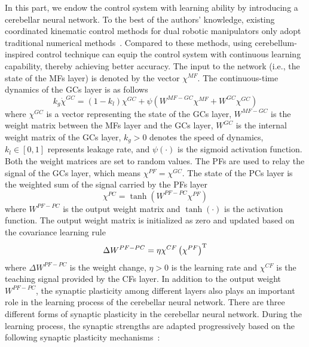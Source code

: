 \documentclass[journal,twoside,web]{ieeecolor}
\begin{document}
In this part, we endow the control system with learning ability by introducing a cerebellar neural network. To the best of the authors' knowledge, existing coordinated kinematic control methods for dual robotic manipulators only adopt traditional numerical methods~\cite{Chen2020,Zhang2021TNNLS}. Compared to these methods, using cerebellum-inspired control technique can equip the control system with continuous learning capability, thereby achieving better accuracy. The input to the network (i.e., the state of the MFs layer) is denoted by the vector $\chi^{MF}$. The continuous-time dynamics of the GCs layer is as follows
\begin{equation}
k_g\dot{\chi}^{GC} = (1-k_l) \chi^{GC} + \psi\left(W^{MF-GC}\chi^{MF} + W^{GC} \chi^{GC}\right)
\label{eq:GC}
\end{equation}
where $\chi^{GC}$ is a vector representing the state of the GCs layer, $W^{MF-GC}$ is the weight matrix between the MFs layer and the GCs layer, $W^{GC}$ is the internal weight matrix of the GCs layer, $k_g > 0$ denotes the speed of dynamics, $k_l \in [0,1]$ represents leakage rate, and $\psi(\cdot)$ is the sigmoid activation function. Both the weight matrices are set to random values. The PFs are used to relay the signal of the GCs layer, which means $\chi^{PF} = \chi^{GC}$. The state of the PCs layer is the weighted sum of the signal carried by the PFs layer
\begin{equation}
\chi^{PC} = \tanh\left(W^{PF-PC}\chi^{PF}\right)
\label{eq:PC}
\end{equation}
where $W^{PF-PC}$ is the output weight matrix and $\tanh(\cdot)$ is the activation function. The output weight matrix is initialized as zero and updated based on the covariance learning rule~\cite{Porrill2007}
\begin{equation}
\Delta W^{PF-PC} = \eta \chi^{CF} \left(\chi^{PF}\right)^{\rm T}
\label{eq:W PF-PC}
\end{equation}
where $\Delta W^{PF-PC}$ is the weight change, $\eta > 0$ is the learning rate and $\chi^{CF}$ is the teaching signal provided by the CFs layer. In addition to the output weight $W^{PF-PC}$, the synaptic plasticity among different layers also plays an important role in the learning process of the cerebellar neural network. There are three different forms of synaptic plasticity in the cerebellar neural network. During the learning process, the synaptic strengths are adapted progressively based on the following synaptic plasticity mechanisms~\cite{Tolu2020}:
\end{document}
